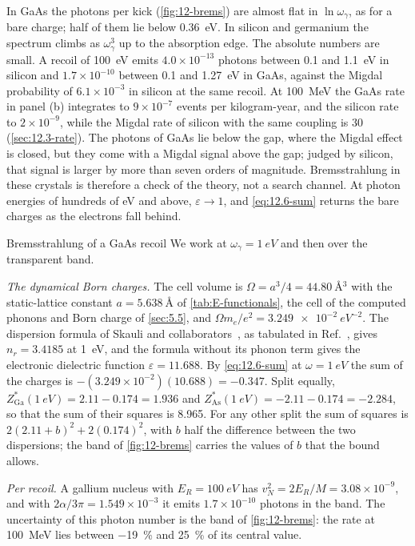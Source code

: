 In GaAs the photons per kick (\cref{fig:12-brems}) are almost flat in $\ln\omega_\gamma$, as for a bare charge; half of them lie below \SI{0.36}{eV}. In silicon and germanium the spectrum climbs as $\omega_\gamma^3$ up to the absorption edge. The absolute numbers are small. A recoil of \SI{100}{eV} emits $4.0\times10^{-13}$ photons between 0.1 and \SI{1.1}{eV} in silicon and $1.7\times10^{-10}$ between 0.1 and \SI{1.27}{eV} in GaAs, against the Migdal probability of $6.1\times10^{-3}$ in silicon at the same recoil. At \SI{100}{MeV} the GaAs rate in panel (b) integrates to $9\times10^{-7}$ events per kilogram-year, and the silicon rate to $2\times10^{-9}$, while the Migdal rate of silicon with the same coupling is 30 (\cref{sec:12.3-rate}). The photons of GaAs lie below the gap, where the Migdal effect is closed, but they come with a Migdal signal above the gap; judged by silicon, that signal is larger by more than seven orders of magnitude. Bremsstrahlung in these crystals is therefore a check of the theory, not a search channel. At photon energies of hundreds of eV and above, $\varepsilon \to 1$, and \cref{eq:12.6-sum} returns the bare charges as the electrons fall behind.

\begin{workedexample}{Bremsstrahlung of a GaAs recoil}\label{we:12-gaas}
We work at $\omega_\gamma = \SI{1}{eV}$ and then over the transparent band.

\emph{The dynamical Born charges.} The cell volume is $\Omega = a^3/4 = \SI{44.80}{\angstrom^3}$ with the static-lattice constant $a = \SI{5.638}{\angstrom}$ of \cref{tab:E-functionals}, the cell of the computed phonons and Born charge of \cref{sec:5.5}, and $\Omega m_e/e^2 = \SI{3.249e-2}{eV^{-2}}$. The dispersion formula of Skauli and collaborators~\cite{skauli2003improved}, as tabulated in Ref.~\cite{polyanskiy2024refractiveindex}, gives $n_r = 3.4185$ at \SI{1}{eV}, and the formula without its phonon term gives the electronic dielectric function $\varepsilon = 11.688$. By \cref{eq:12.6-sum} at $\omega = \SI{1}{eV}$ the sum of the charges is $-(3.249\times10^{-2})(10.688) = -0.347$. Split equally, $Z^*_{\mathrm{Ga}}(\SI{1}{eV}) = 2.11 - 0.174 = 1.936$ and $Z^*_{\mathrm{As}}(\SI{1}{eV}) = -2.11 - 0.174 = -2.284$, so that the sum of their squares is 8.965. For any other split the sum of squares is $2(2.11 + b)^2 + 2(0.174)^2$, with $b$ half the difference between the two dispersions; the band of \cref{fig:12-brems} carries the values of $b$ that the bound allows.

\emph{Per recoil.} A gallium nucleus with $E_R = \SI{100}{eV}$ has $v_N^2 = 2E_R/M = 3.08\times10^{-9}$, and with $2\alpha/3\pi = 1.549\times10^{-3}$ it emits $1.7\times10^{-10}$ photons in the band. The uncertainty of this photon number is the band of \cref{fig:12-brems}: the rate at \SI{100}{MeV} lies between \SI{-19}{\percent} and \SI{+25}{\percent} of its central value.
\end{workedexample}

